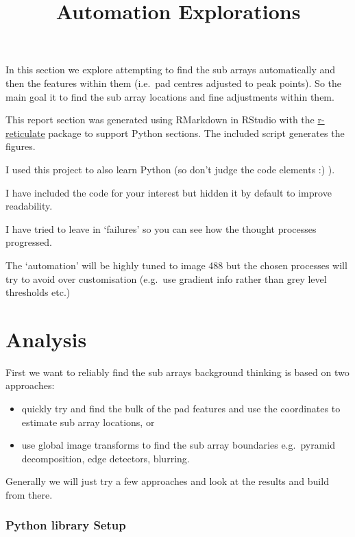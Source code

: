 \documentclass[
]{article}
\title{Automation Explorations}
\author{}
\date{\vspace{-2.5em}}
\providecommand{\tightlist}{%
  \setlength{\itemsep}{0pt}\setlength{\parskip}{0pt}}
\begin{document}
\maketitle

In this section we explore attempting to find the sub arrays
automatically and then the features within them (i.e.~pad centres
adjusted to peak points). So the main goal it to find the sub array
locations and fine adjustments within them.

This report section was generated using RMarkdown in RStudio with the
\href{https://rstudio.github.io/reticulate/index.html}{r-reticulate}
package to support Python sections. The included script generates the
figures.

I used this project to also learn Python (so don't judge the code
elements :) ).

I have included the code for your interest but hidden it by default to
improve readability.

I have tried to leave in `failures' so you can see how the thought
processes progressed.

The `automation' will be highly tuned to image 488 but the chosen
processes will try to avoid over customisation (e.g.~use gradient info
rather than grey level thresholds etc.)

\hypertarget{analysis}{%
\section{Analysis}\label{analysis}}

First we want to reliably find the sub arrays background thinking is
based on two approaches:

\begin{itemize}
\tightlist
\item
  quickly try and find the bulk of the pad features and use the
  coordinates to estimate sub array locations, or
\item
  use global image transforms to find the sub array boundaries
  e.g.~pyramid decomposition, edge detectors, blurring.
\end{itemize}

Generally we will just try a few approaches and look at the results and
build from there.

\hypertarget{python-library-setup}{%
\subsubsection{Python library Setup}\label{python-library-setup}}
\end{document}

